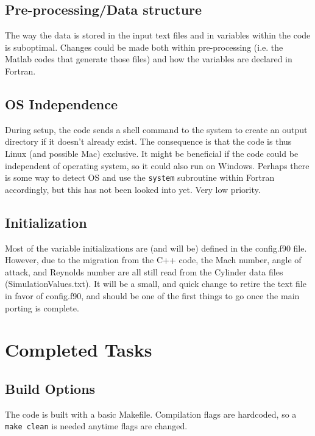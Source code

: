 \documentclass[12pt]{article}
\begin{document}
    \subsection{Pre-processing/Data structure}
    The way the data is stored in the input text files and in variables within the code is suboptimal. Changes could be made both within pre-processing (i.e. the Matlab codes that generate those files) and how the variables are declared in Fortran.

    \subsection{OS Independence}
    During setup, the code sends a shell command to the system to create an output directory if it doesn't already exist. The consequence is that the code is thus Linux (and possible Mac) exclusive. It might be beneficial if the code could be independent of operating system, so it could also run on Windows. Perhaps there is some way to detect OS and use the \texttt{system} subroutine within Fortran accordingly, but this has not been looked into yet. Very low priority.

    \subsection{Initialization}
    Most of the variable initializations are (and will be) defined in the config.f90 file. However, due to the migration from the C++ code, the Mach number, angle of attack, and Reynolds number are all still read from the Cylinder data files (SimulationValues.txt). It will be a small, and quick change to retire the text file in favor of config.f90, and should be one of the first things to go once the main porting is complete.

    \newpage
    \section{Completed Tasks}

    \subsection{Build Options}
    The code is built with a basic Makefile. Compilation flags are hardcoded, so a \texttt{make clean} is needed anytime flags are changed.
\end{document}
